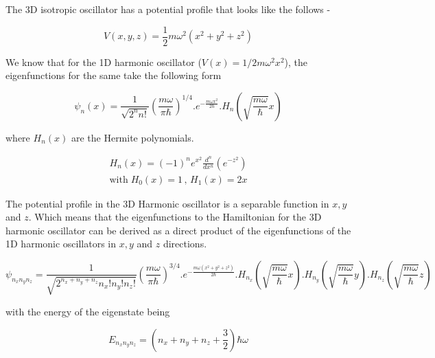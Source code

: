 

    The 3D isotropic oscillator has a potential profile that looks like the follows - 

    \begin{equation*}
        V(x,y,z) = \frac{1}{2}m\omega^2(x^2 + y^2 + z^2)
    \end{equation*}

    We know that for the 1D harmonic oscillator ($V(x) = 1/2 m\omega^2x^2$), the eigenfunctions for the same take the following form

    \begin{equation*}
        \psi_n(x) = \frac{1}{\sqrt{2^nn!}} \left( \frac{m\omega}{\pi\hbar} \right)^{1/4} . e^{-\frac{m\omega x^2}{2\hbar}} . H_n \left( \sqrt{\frac{m\omega}{\hbar}} x \right)
    \end{equation*}

    where $H_n(x)$ are the Hermite polynomials.

    \begin{gather*}
        H_n(x) = (-1)^n e^{x^2} \frac{d^n}{dx^n} (e^{-z^2}) \\
        \text{with} \; H_0(x) = 1 \, , \, H_1(x) = 2x
    \end{gather*}

    The potential profile in the 3D Harmonic oscillator is a separable function in $x,y$ and $z$. Which means that the eigenfunctions to the Hamiltonian for the 3D harmonic oscillator can be derived as a direct product of the eigenfunctions of the 1D harmonic oscillators in $x,y$ and $z$ directions.

    \begin{equation*}
        \psi_{n_xn_yn_z} = \frac{1}{\sqrt{2^{n_x + n_y + n_z} n_x! n_y! n_z!}} \left( \frac{m\omega}{\pi\hbar} \right)^{3/4} . e^{-\frac{m\omega (x^2 + y^2 + z^2)}{2\hbar}} . H_{n_x} \left( \sqrt{\frac{m\omega}{\hbar}} x \right) . H_{n_y} \left( \sqrt{\frac{m\omega}{\hbar}} y \right) . H_{n_z} \left( \sqrt{\frac{m\omega}{\hbar}} z \right)
    \end{equation*}

    with the energy of the eigenstate being

    \begin{equation*}
        E_{n_xn_yn_z} = \left( n_x + n_y + n_z + \frac{3}{2} \right) \hbar\omega
    \end{equation*}

